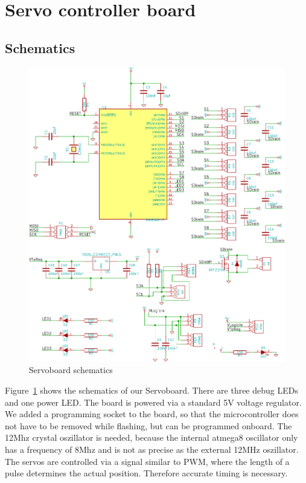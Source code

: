 \documentclass[a4paper
               ,10pt
               ,DIV=10 %
               ,BCOR=0.3cm
               ,pagesize %
               ,headings=small
               ,bibtotoc
               ]
               {scrartcl}
\begin{document}
\section{Servo controller board}

\subsection{Schematics}

\begin{figure}[H]
\begin{center}
\includegraphics[width=\linewidth]{pic/servoboard}
\caption{Servoboard schematics}
\label{figservoboardscm}
\end{center}
\end{figure}

Figure~\ref{figservoboardscm} shows the schematics of our Servoboard.
There are three debug LEDs and one power LED.
The board is powered via a standard 5V voltage regulator.
We added a programming socket to the board, so that the microcontroller does not have to be removed while flashing, but can be programmed onboard.
The 12Mhz crystal oszillator is needed, because the internal atmega8 oscillator only has a frequency of 8Mhz and is not as precise as the external 12MHz oszillator.
The servos are controlled via a signal similar to PWM, where the length of a pulse determines the actual position.
Therefore accurate timing is necessary.
\end{document}
